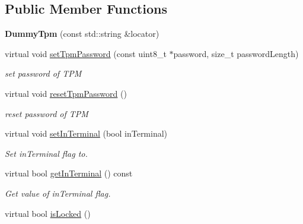 \subsection*{Public Member Functions}
\begin{DoxyCompactItemize}
\item 
{\bfseries Dummy\+Tpm} (const std\+::string \&locator)\hypertarget{classndn_1_1security_1_1DummyTpm_a2351c6c5b2fa1371228ce60aa853a982}{}\label{classndn_1_1security_1_1DummyTpm_a2351c6c5b2fa1371228ce60aa853a982}

\item 
virtual void \hyperlink{classndn_1_1security_1_1DummyTpm_ad1ecfb3b26a9b16a0f382a90a340c9bf}{set\+Tpm\+Password} (const uint8\+\_\+t $\ast$password, size\+\_\+t password\+Length)
\begin{DoxyCompactList}\small\item\em set password of T\+PM \end{DoxyCompactList}\item 
virtual void \hyperlink{classndn_1_1security_1_1DummyTpm_a814688af52ab4293338783cd2f9e7e36}{reset\+Tpm\+Password} ()\hypertarget{classndn_1_1security_1_1DummyTpm_a814688af52ab4293338783cd2f9e7e36}{}\label{classndn_1_1security_1_1DummyTpm_a814688af52ab4293338783cd2f9e7e36}

\begin{DoxyCompactList}\small\item\em reset password of T\+PM \end{DoxyCompactList}\item 
virtual void \hyperlink{classndn_1_1security_1_1DummyTpm_a8f8bc92647ef7a9b50e0b647df9bddfd}{set\+In\+Terminal} (bool in\+Terminal)
\begin{DoxyCompactList}\small\item\em Set in\+Terminal flag to. \end{DoxyCompactList}\item 
virtual bool \hyperlink{classndn_1_1security_1_1DummyTpm_a83a3d1e1d10a80caf5b74331e2b66bfd}{get\+In\+Terminal} () const\hypertarget{classndn_1_1security_1_1DummyTpm_a83a3d1e1d10a80caf5b74331e2b66bfd}{}\label{classndn_1_1security_1_1DummyTpm_a83a3d1e1d10a80caf5b74331e2b66bfd}

\begin{DoxyCompactList}\small\item\em Get value of in\+Terminal flag. \end{DoxyCompactList}\item 
virtual bool \hyperlink{classndn_1_1security_1_1DummyTpm_afb7625ae281ee96ca77e3748a9f19d14}{is\+Locked} ()\hypertarget{classndn_1_1security_1_1DummyTpm_afb7625ae281ee96ca77e3748a9f19d14}{}\label{classndn_1_1security_1_1DummyTpm_afb7625ae281ee96ca77e3748a9f19d14}


\end{DoxyCompactItemize}
